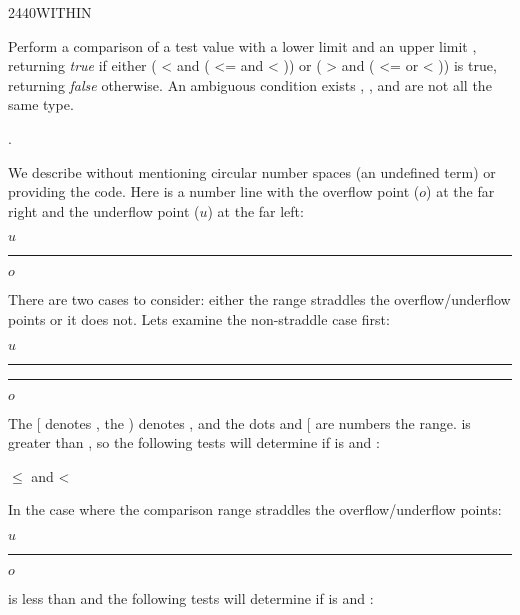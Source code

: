 \begin{worddef}{2440}{WITHIN}
\item {}

	Perform a comparison of a test value  with a
	lower limit  and an upper limit
	, returning \emph{true} if either
	( <   and
	( <=  and
	  <  )) or
	( >   and
	( <=  or
	  <  )) is true, returning
	\emph{false} otherwise. An ambiguous condition exists
	, , and  are not
	all the same type.

\see {}.

	\begin{rationale} %
		We describe  without mentioning circular number
		spaces (an undefined term) or providing the code. Here is a
		number line with the overflow point ($o$) at the far right and
		the underflow point ($u$) at the far left:
		\begin{center}
			$u$ \rule[.5ex]{15em}{.4pt} $o$
		\end{center}
		There are two cases to consider: either the
		 range straddles the overflow/underflow
		points or it does not. Lets examine the non-straddle case
		first:
		\begin{center}
			$u$ \rule[.5ex]{5em}{.4pt} \makebox[5em]{[\dotfill)} \rule[.5ex]{5em}{.4pt} $o$
		\end{center}
		The [ denotes , the ) denotes ,
		and the dots and [ are numbers  the range.
		 is greater than , so the
		following tests will determine if  is
		  and :
		\begin{center}
			 $\le$  and  < 
		\end{center}
		In the case where the comparison range straddles the
		overflow/underflow points:
		\begin{center}
			$u$\makebox[5em]{\dotfill)} \rule[.5ex]{5em}{.4pt} \makebox[5em]{[\dotfill}$o$
		\end{center}
		 is less than  and the following
		tests will determine if  is 
		 and :

\end{rationale}
\end{worddef}
